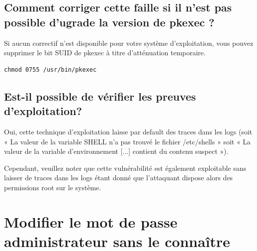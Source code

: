 \documentclass[12pt,a4paper]{article}
\begin{document}
            \subsection{Comment corriger cette faille si il n'est pas possible d'ugrade la version de pkexec ?}
            \begin{flushleft}
                \noindent Si aucun correctif n’est disponible pour votre système d’exploitation, vous pouvez supprimer le bit SUID de pkexec à titre d’atténuation temporaire.
                \begin{lstlisting}
chmod 0755 /usr/bin/pkexec
                \end{lstlisting}
            \end{flushleft}
            \subsection{Est-il possible de vérifier les preuves d’exploitation?}
            \begin{flushleft}
                \noindent Oui, cette technique d’exploitation laisse par default des traces dans les logs (soit « La valeur de la variable SHELL n’a pas trouvé le fichier /etc/shells » soit « La valeur de la variable d’environnement [...] contient du contenu suspect »). 
                \item Cependant, veuillez noter que cette vulnérabilité est également exploitable sans laisser de traces dans les logs étant donné que l'attaquant dispose alors des permissions root sur le système.
            \end{flushleft}
    \newpage
   \section{Modifier le mot de passe administrateur sans le connaître}
\end{document}
